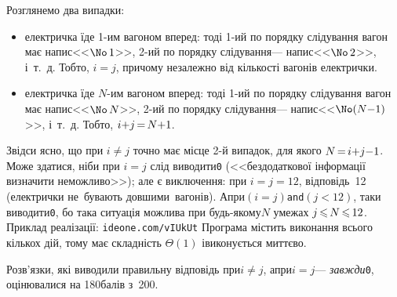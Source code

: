 \Tutorial	Розглянемо два випадки: 

\begin{itemize}[leftmargin=*,itemsep=0pt,partopsep=0pt,topsep=0pt,parsep=0pt]
\item
електричка їде \mbox{1-им} вагоном вперед: тоді 
\mbox{1-ий} по порядку слідування вагон має напис\nolinebreak[2] <<$\No\,1$>>, 
\mbox{2-ий} по порядку слідування\nolinebreak[3] --- напис\nolinebreak[2] <<$\No\,2$>>, 
і~т.~д. Тобто, ${i{=}j}$, причому незалежно від кількості вагонів електрички.
\item
електричка їде \mbox{$N$-им} вагоном вперед: тоді 
\mbox{1-ий} по порядку слідування вагон має напис\nolinebreak[2] <<$\No\,N$>>, 
\mbox{2-ий} по порядку слідування\nolinebreak[3] --- напис\nolinebreak[2] <<$\No(N{-}1)$>>, 
і~т.~д. Тобто, ${i{+}j}\dib{{=}}{N{+}1}$.
\end{itemize}

Звідси ясно, що при $i{\neq}j$ точно має місце \mbox{2-й} випадок, для якого $N\dib{{=}}{i{+}j{-}1}$. Може здатися, ніби при $i{=}j$ слід виводити\nolinebreak[3] \texttt{0} (<<без\nolinebreak[1] додаткової інформації визначити неможливо>>); але є виключення: при $i{=}j{=}12$, відповідь~12 (електрички не~бувають довшими~вагонів). А\nolinebreak[3] при\nolinebreak[1] $({i{=}j})$\nolinebreak[3] \texttt{and}\nolinebreak[2] $({j{<}12})$, таки виводити\nolinebreak[3] \texttt{0}, бо така ситуація можлива при будь-якому\nolinebreak[3] $N$ 
у\nolinebreak[3] межах $j\dib{{\<}}N\dib{{\<}}12$.
Приклад реалізації: \verb"ideone.com/vIUkUt"\hspace{0.5em plus 1em}
Програма містить виконання всього кількох дій, тому має складність $\Theta(1)$ і\nolinebreak[3] виконується миттєво.

Розв'язки, які виводили правильну відповідь при\nolinebreak[2] $i{\neq}j$, а\nolinebreak[3] при\nolinebreak[2]  $i{=}j$\nolinebreak[3] --- \emph{завжди}\nolinebreak[3] \texttt{0}, оцінювалися на 180\nolinebreak[3] балів з~200.


